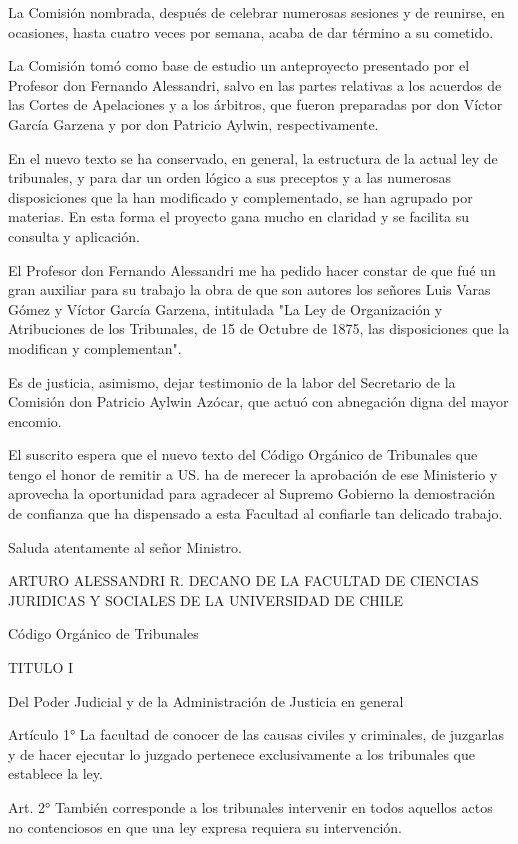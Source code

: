     La Comisión nombrada, después de celebrar numerosas sesiones y de reunirse, en ocasiones, hasta cuatro veces por semana, acaba de dar término a su cometido.

    La Comisión tomó como base de estudio un anteproyecto presentado por el Profesor don Fernando Alessandri, salvo en las partes relativas a los acuerdos de las Cortes de Apelaciones y a los árbitros, que fueron preparadas por don Víctor García Garzena y por don Patricio Aylwin, respectivamente.

    En el nuevo texto se ha conservado, en general, la estructura de la actual ley de tribunales, y para dar un orden lógico a sus preceptos y a las numerosas disposiciones que la han modificado y complementado, se han agrupado por materias. En esta forma el proyecto gana mucho en claridad y se facilita su consulta y aplicación.

    El Profesor don Fernando Alessandri me ha pedido hacer constar de que fué un gran auxiliar para su trabajo la obra de que son autores los señores Luis Varas Gómez y Víctor García Garzena, intitulada "La Ley de Organización y Atribuciones de los Tribunales, de 15 de Octubre de 1875, las disposiciones que la modifican y complementan".

    Es de justicia, asimismo, dejar testimonio de la labor del Secretario de la Comisión don Patricio Aylwin Azócar, que actuó con abnegación digna del mayor encomio.

    El suscrito espera que el nuevo texto del Código Orgánico de Tribunales que tengo el honor de remitir a US. ha de merecer la aprobación de ese Ministerio y aprovecha la oportunidad para agradecer al Supremo Gobierno la demostración de confianza que ha dispensado a esta Facultad al confiarle tan delicado trabajo.

    Saluda atentamente al señor Ministro.

    ARTURO ALESSANDRI R.
    DECANO DE LA FACULTAD DE CIENCIAS JURIDICAS
    Y SOCIALES DE LA UNIVERSIDAD DE CHILE

    Código Orgánico de Tribunales


    TITULO I

    Del Poder Judicial y de la Administración de Justicia en general


    Artículo 1° La facultad de conocer de las causas civiles y criminales, de juzgarlas y de hacer ejecutar lo juzgado pertenece exclusivamente a los tribunales que establece la ley.


    Art. 2° También corresponde a los tribunales intervenir en todos aquellos actos no contenciosos en que una ley expresa requiera su intervención.


